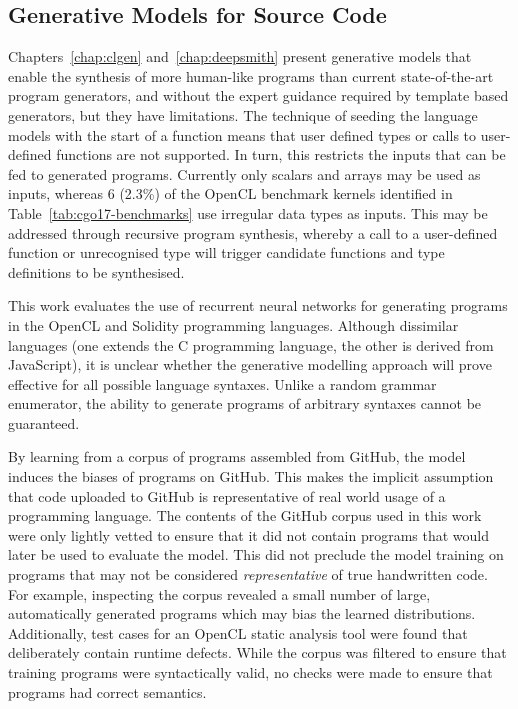 \subsection{Generative Models for Source Code}

Chapters~\ref{chap:clgen} and~\ref{chap:deepsmith} present generative models that enable the synthesis of more human-like programs than current state-of-the-art program generators, and without the expert guidance required by template based generators, but they have limitations. The technique of seeding the language models with the start of a function means that user defined types or calls to user-defined functions are not supported. In turn, this restricts the inputs that can be fed to generated programs. Currently only  scalars and arrays may be used as inputs, whereas 6 (2.3\%) of the OpenCL benchmark kernels identified in Table~\ref{tab:cgo17-benchmarks} use irregular data types as inputs. This may be addressed through recursive program synthesis, whereby a call to a user-defined function or unrecognised type will trigger candidate functions and type definitions to be synthesised.

This work evaluates the use of recurrent neural networks for generating programs in the OpenCL and Solidity programming languages. Although dissimilar languages (one extends the C programming language, the other is derived from JavaScript), it is unclear whether the generative modelling approach will prove effective for all possible language syntaxes. Unlike a random grammar enumerator, the ability to generate programs of arbitrary syntaxes cannot be guaranteed.

By learning from a corpus of programs assembled from GitHub, the model induces the biases of programs on GitHub. This makes the implicit assumption that code uploaded to GitHub is representative of real world usage of a programming language. The contents of the GitHub corpus used in this work were only lightly vetted to ensure that it did not contain programs that would later be used to evaluate the model. This did not preclude the model training on programs that may not be considered \emph{representative} of true handwritten code. For example, inspecting the corpus revealed a small number of large, automatically generated programs which may bias the learned distributions. Additionally, test cases for an OpenCL static analysis tool were found that deliberately contain runtime defects. While the corpus was filtered to ensure that training programs were syntactically valid, no checks were made to ensure that programs had correct semantics.


